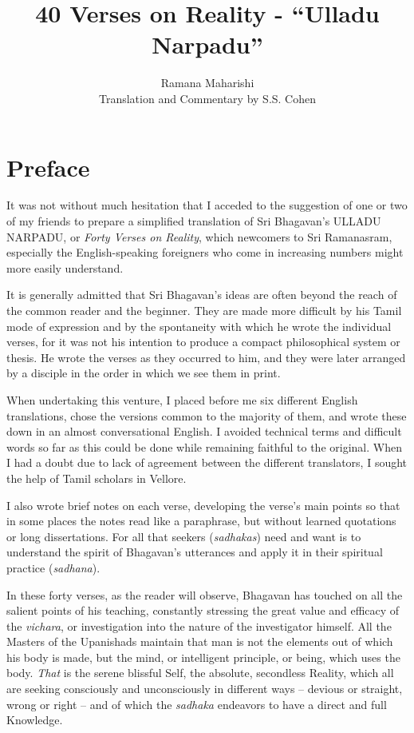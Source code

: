 \documentclass[12pt]{report}
\begin{document}
\title{40 Verses on Reality - ``Ulladu Narpadu''}
\author{Ramana Maharishi \\ Translation and Commentary by S.S. Cohen}
\maketitle


\tableofcontents

\chapter{Preface}

It was not without much hesitation that I acceded to the suggestion of
one or two of my friends to prepare a simplified translation of Sri
Bhagavan's ULLADU NARPADU, or \emph{Forty Verses on Reality}, which
newcomers to Sri Ramanasram, especially the English-speaking
foreigners who come in increasing numbers might more easily
understand.

It is generally admitted that Sri Bhagavan's ideas are often beyond
the reach of the common reader and the beginner. They are made more
difficult by his Tamil mode of expression and by the spontaneity with
which he wrote the individual verses, for it was not his intention to
produce a compact philosophical system or thesis. He wrote the verses
as they occurred to him, and they were later arranged by a disciple in
the order in which we see them in print.

When undertaking this venture, I placed before me six different
English translations, chose the versions common to the majority of
them, and wrote these down in an almost conversational English. I
avoided technical terms and difficult words so far as this could be
done while remaining faithful to the original. When I had a doubt due
to lack of agreement between the different translators, I sought the
help of Tamil scholars in Vellore.

I also wrote brief notes on each verse, developing the verse's main
points so that in some places the notes read like a paraphrase, but
without learned quotations or long dissertations. For all that seekers
(\emph{sadhakas}) need and want is to understand the spirit of
Bhagavan's utterances and apply it in their spiritual practice
(\emph{sadhana}).

In these forty verses, as the reader will observe, Bhagavan has
touched on all the salient points of his teaching, constantly
stressing the great value and efficacy of the \emph{vichara}, or
investigation into the nature of the investigator himself. All the
Masters of the Upanishads maintain that man is not the elements out of
which his body is made, but the mind, or intelligent principle, or
being, which uses the body. \emph{That} is the serene blissful Self,
the absolute, secondless Reality, which all are seeking consciously
and unconsciously in different ways -- devious or straight, wrong or
right -- and of which the \emph{sadhaka} endeavors to have a direct
and full Knowledge.
\end{document}
